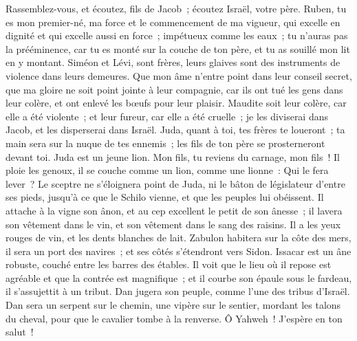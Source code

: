 \begin{multicols}{2}
Rassemblez-vous, et écoutez, fils de Jacob~; écoutez Israël, votre père.
Ruben, tu es mon premier-né, ma force et le commencement de ma vigueur, qui excelle en dignité et qui excelle aussi en force~;
impétueux comme les eaux~; tu n'auras pas la prééminence, car tu es monté sur la couche de ton père, et tu as souillé mon lit en y montant.
Siméon et Lévi, sont frères, leurs glaives sont des instruments de violence dans leurs demeures.
Que mon âme n'entre point dans leur conseil secret, que ma gloire ne soit point jointe à leur compagnie, car ils ont tué les gens dans leur colère, et ont enlevé les bœufs pour leur plaisir.
Maudite soit leur colère, car elle a été violente~; et leur fureur, car elle a été cruelle~; je les diviserai dans Jacob, et les disperserai dans Israël.
Juda, quant à toi, tes frères te loueront~; ta main sera sur la nuque de tes ennemis~; les fils de ton père se prosterneront devant toi.
Juda est un jeune lion. Mon fils, tu reviens du carnage, mon fils~! Il ploie les genoux, il se couche comme un lion, comme une lionne~: Qui le fera lever~?
Le sceptre ne s'éloignera point de Juda, ni le bâton de législateur d'entre ses pieds, jusqu'à ce que le Schilo vienne, et que les peuples lui obéissent.
Il attache à la vigne son ânon, et au cep excellent le petit de son ânesse~; il lavera son vêtement dans le vin, et son vêtement dans le sang des raisins.
Il a les yeux rouges de vin, et les dents blanches de lait.
Zabulon habitera sur la côte des mers, il sera un port des navires~; et ses côtés s'étendront vers Sidon.
Issacar est un âne robuste, couché entre les barres des étables.
Il voit que le lieu où il repose est agréable et que la contrée est magnifique~; et il courbe son épaule sous le fardeau, il s'assujettit à un tribut.
Dan jugera son peuple, comme l'une des tribus d'Israël.
Dan sera un serpent sur le chemin, une vipère sur le sentier, mordant les talons du cheval, pour que le cavalier tombe à la renverse.
Ô Yahweh~! J'espère en ton salut~!

\end{multicols}
